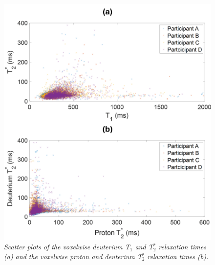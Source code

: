 \begin{figure}
    \centering
    \includegraphics[width=1\linewidth]{Figures/D2O/Scatter.png}
    \caption{\textit{Scatter plots of the voxelwise deuterium T$_1$ and T$_2^*$ relaxation times (a) and the voxelwise proton and deuterium T$_2^*$ relaxation times (b).}}
    \label{fig:D2O:scatter}
\end{figure}


